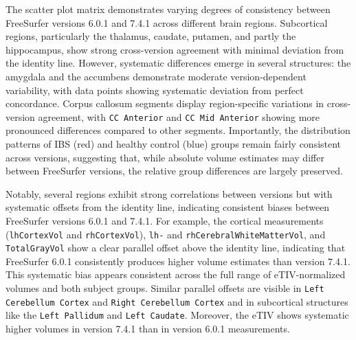 \documentclass[diagnostics,article,accept,pdftex,moreauthors]{Definitions/mdpi}
\begin{document}
The scatter plot matrix demonstrates varying degrees of consistency between FreeSurfer versions 6.0.1 and 7.4.1 across different brain regions. Subcortical regions, particularly the thalamus, caudate, putamen, and partly the hippocampus, show strong cross-version agreement with minimal deviation from the identity line. However, systematic differences emerge in several structures: the amygdala and the accumbens demonstrate moderate version-dependent variability, with data points showing systematic deviation from perfect concordance. Corpus callosum segments display region-specific variations in cross-version agreement, with \texttt{CC Anterior} and \texttt{CC Mid Anterior} showing more pronounced differences compared to other segments. Importantly, the distribution patterns of IBS (red) and healthy control (blue) groups remain fairly consistent across versions, suggesting that, while absolute volume estimates may differ between FreeSurfer versions, the relative group differences are largely preserved. 

Notably, several regions exhibit strong correlations between versions but with systematic offsets from the identity line, indicating consistent biases between FreeSurfer versions 6.0.1 and 7.4.1. For example, the cortical measurements (\texttt{lhCortexVol} and \texttt{rhCortexVol}), \texttt{lh-} and \texttt{rhCerebralWhiteMatterVol}, and \texttt{TotalGrayVol} show a clear parallel offset above the identity line, indicating that FreeSurfer 6.0.1 consistently produces higher volume estimates than version 7.4.1. This systematic bias appears consistent across the full range of eTIV-normalized volumes and both subject groups. Similar parallel offsets are visible in \texttt{Left Cerebellum Cortex} and \texttt{Right Cerebellum Cortex} and in subcortical structures like the \texttt{Left Pallidum} and \texttt{Left Caudate}. Moreover, the eTIV shows systematic higher volumes in version 7.4.1 than in version 6.0.1 measurements. 
\end{document}
